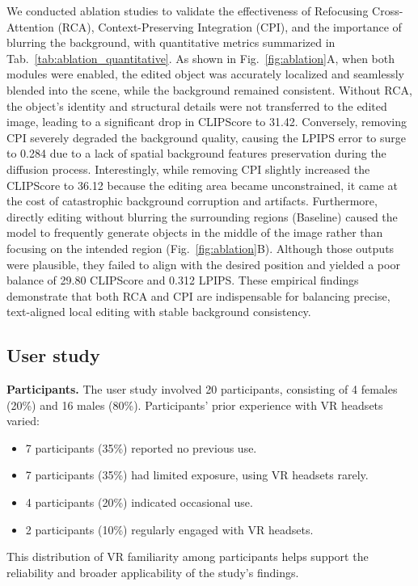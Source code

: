 \documentclass[runningheads]{llncs}
\begin{document}
We conducted ablation studies to validate the effectiveness of Refocusing Cross-Attention (RCA), Context-Preserving Integration (CPI), and the importance of blurring the background, with quantitative metrics summarized in Tab.~\ref{tab:ablation_quantitative}. As shown in Fig.~\ref{fig:ablation}A, when both modules were enabled, the edited object was accurately localized and seamlessly blended into the scene, while the background remained consistent. Without RCA, the object’s identity and structural details were not transferred to the edited image, leading to a significant drop in CLIPScore to 31.42. Conversely, removing CPI severely degraded the background quality, causing the LPIPS error to surge to 0.284 due to a lack of spatial background features preservation during the diffusion process. Interestingly, while removing CPI slightly increased the CLIPScore to 36.12 because the editing area became unconstrained, it came at the cost of catastrophic background corruption and artifacts. Furthermore, directly editing without blurring the surrounding regions (Baseline) caused the model to frequently generate objects in the middle of the image rather than focusing on the intended region (Fig.~\ref{fig:ablation}B). Although those outputs were plausible, they failed to align with the desired position and yielded a poor balance of 29.80 CLIPScore and 0.312 LPIPS. These empirical findings demonstrate that both RCA and CPI are indispensable for balancing precise, text-aligned local editing with stable background consistency.


\subsection{User study}
\textbf{Participants. }
The user study involved 20 participants, consisting of 4 females (20\%) and 16 males (80\%). Participants’ prior experience with VR headsets varied:
\begin{itemize}
    \item 7 participants (35\%) reported no previous use.
    \item 7 participants (35\%) had limited exposure, using VR headsets rarely.
    \item 4 participants (20\%) indicated occasional use.
    \item 2 participants (10\%) regularly engaged with VR headsets.
\end{itemize}

This distribution of VR familiarity among participants helps support the reliability and broader applicability of the study’s findings.
\end{document}
